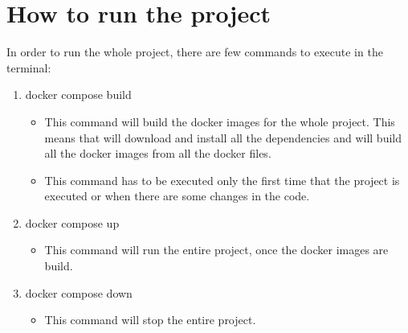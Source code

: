 \documentclass[a4paper,12pt]{article}
\begin{document}
\section*{How to run the project}
In order to run the whole project, there are few commands to execute in the terminal:
\begin{enumerate}
    \item docker compose build
    \begin{itemize}
        \item This command will build the docker images for the whole project. This means that will download and install all the dependencies and will build all the docker images from all the docker files.
        \item This command has to be executed only the first time that the project is executed or when there are some changes in the code.
    \end{itemize}
    \item docker compose up
    \begin{itemize}
        \item This command will run the entire project, once the docker images are build.
    \end{itemize}
    \item docker compose down
    \begin{itemize}
        \item This command will stop the entire project.
    \end{itemize}
\end{enumerate}
\end{document}
